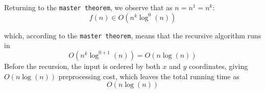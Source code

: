 \documentclass{tufte-handout}
\begin{document}
Returning to the \texttt{master theorem}, we observe that as $n = n^1 = n^k$:
$$f(n) \in O\left(n^k \log^0(n)\right)$$

which, according to the \texttt{master theorem}, means that the recursive
algorithm runs in
$$O(n^k \log^{0+1}(n)) = O(n \log(n))$$
Before the recursion, the input is ordered by both $x$ and $y$ coordinates,
giving $O(n \log(n))$ preprocessing cost, which leaves the total running time as
$$O\left(n \log(n)\right)$$
\end{document}
